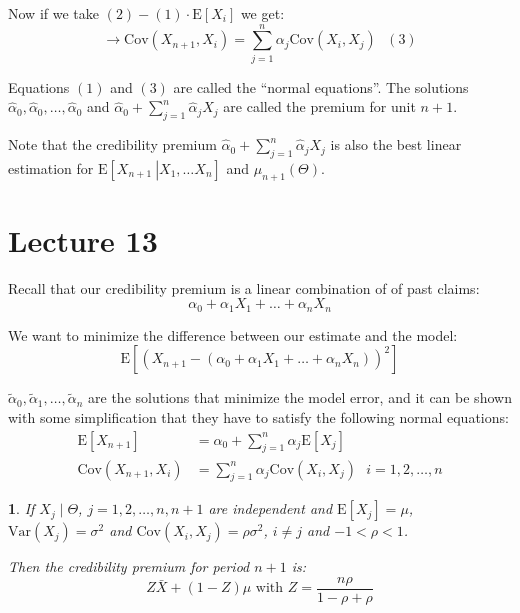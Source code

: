 \documentclass[english,12pt]{article}
\theoremstyle{plain}
\newtheorem*{theorem}{\protect\theoremname}
\theoremstyle{definition}
\theoremstyle{definition} %
\providecommand{\theoremname}{Theorem}
\newcommand{\brac}[1]{\left(#1\right)} %
\newcommand{\ex}[1]{\mbox{E} \left[ #1 \right]}
\newcommand{\var}[1]{\mbox{Var} \left( #1 \right)}
\newcommand{\cov}[1]{\mbox{Cov} \left( #1 \right)}
\newcommand{\condex}[2]{\mbox{E} \left[ \left. #1 \ \right\vert \left. #2 \right. \right]}
\begin{document}
Now if we take $(2)-(1)\cdot \ex{X_i}$ we get:
\[\rightarrow \cov{X_{n+1},X_i}=\sum\limits_{j=1}^n\alpha_j\cov{X_i,X_j}\text{ }(3)\]

Equations $(1)$ and $(3)$ are called the ``normal equations''.  The solutions $\hat{\alpha}_0,\hat{\alpha}_0,\ldots,\hat{\alpha}_0$ and $\hat{\alpha}_0+\sum\limits_{j=1}^n\hat{\alpha}_jX_j$ are called the premium for unit $n+1$.

Note that the credibility premium $\hat{\alpha}_0+\sum\limits_{j=1}^n\hat{\alpha}_jX_j$ is also the best linear estimation for $\condex{X_{n+1}}{X_1,\ldots X_n}$ and $\mu_{n+1}(\Theta)$.

\section*{Lecture 13}
Recall that our credibility premium is a linear combination of of past claims:
\[\alpha_0+\alpha_1X_1+\ldots+\alpha_nX_n\]

We want to minimize the difference between our estimate and the model:
\[\ex{\brac{X_{n+1}-\brac{\alpha_0+\alpha_1X_1+\ldots+\alpha_nX_n}}^2}\]

$\tilde{\alpha}_0, \tilde{\alpha}_1,\ldots, \tilde{\alpha}_n$ are the solutions that minimize the model error, and it can be shown with some simplification that they have to satisfy the following normal equations:
\begin{align}
\ex{X_{n+1}}&=\alpha_0+\sum_{j=1}^n\alpha_j\ex{X_j}\\
\cov{X_{n+1},X_i}&=\sum_{j=1}^n\alpha_j\cov{X_i,X_j}\text{ }i=1,2,\ldots,n
\end{align}

\begin{theorem}
If $X_j\mid\Theta$, $j=1,2,\ldots, n, n+1$ are independent and $\ex{X_j}=\mu$, $\var{X_j}=\sigma^2$ and $\cov{X_i,X_j}=\rho\sigma^2$, $i\ne j$ and $-1<\rho<1$.

Then the credibility premium for period $n+1$ is:
\[Z\bar{X}+(1-Z)\mu \text{ with } Z=\frac{n\rho}{1-\rho+\rho}\]
\end{theorem}
\end{document}
